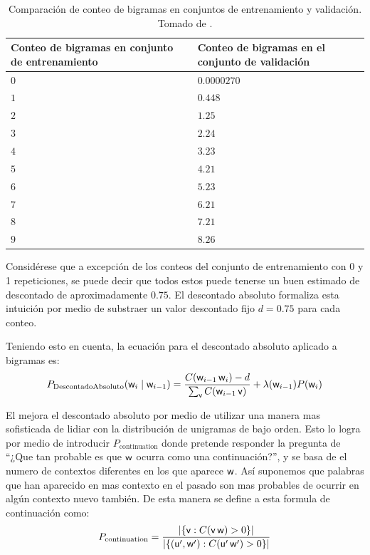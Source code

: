\begin{table}[h!]
\centering
\begin{tabular}{| R{0.2\textwidth} | L{0.2\textwidth} |} \hline
  \textbf{Conteo de bigramas en conjunto de entrenamiento}          & \textbf{Conteo de bigramas en el conjunto de validación} \\ \hline
  $0$ & $0.0000270$ \\ \hline
  $1$ & $0.448$ \\ \hline
  $2$ & $1.25$ \\ \hline
  $3$ & $2.24$ \\ \hline
  $4$ & $3.23$ \\ \hline
  $5$ & $4.21$ \\ \hline
  $6$ & $5.23$ \\ \hline
  $7$ & $6.21$ \\ \hline
  $8$ & $7.21$ \\ \hline
  $9$ & $8.26$ \\ \hline
\end{tabular}
\caption[Comparación de conteo de bigramas en conjuntos de entrenamiento y validación]{Comparación de conteo de bigramas en conjuntos de entrenamiento y validación. Tomado de \cite{jurafsky-martin}.}
\label{table:bigram-train-vs-validation-count}
\end{table}

Considérese que a excepción de los conteos del conjunto de entrenamiento con 0 y 1 repeticiones, se puede decir que todos estos puede tenerse un buen estimado de descontado de aproximadamente $0.75$. El descontado absoluto formaliza esta intuición por medio de substraer un valor descontado fijo $d=0.75$ para cada conteo.

Teniendo esto en cuenta, la ecuación para el descontado absoluto aplicado a bigramas es:
\begin{equation}
  P_{\mathrm{Descontado Absoluto}}({\mathit{\mathsf{w}}}_i \mid {\mathit{\mathsf{w}}}_{i-1}) = \frac{C({\mathit{\mathsf{w}}}_{i-1} \, {\mathit{\mathsf{w}}}_i) - d}{\sum_{{\mathit{\mathsf{v}}}} C({\mathit{\mathsf{w}}}_{i-1} \, {\mathit{\mathsf{v}}})} + \lambda({\mathit{\mathsf{w}}}_{i-1}) P({\mathit{\mathsf{w}}}_i)
\end{equation}

El  mejora el descontado absoluto por medio de utilizar una manera mas sofisticada de lidiar con la distribución de unigramas de bajo orden. Esto lo logra por medio de introducir $P_{\mathrm{continuation}}$ donde pretende responder la pregunta de ``¿Que tan probable es que ${\mathit{\mathsf{w}}}$ ocurra como una continuación?'', y se basa de el numero de contextos diferentes en los que aparece ${\mathit{\mathsf{w}}}$. Así suponemos que palabras que han aparecido en mas contexto en el pasado son mas probables de ocurrir en algún contexto nuevo también. De esta manera se define a esta formula de continuación como:
\begin{equation}
  P_{\mathrm{continuation}}  = \frac{ |\{ {\mathit{\mathsf{v}}} : C({\mathit{\mathsf{v}}} \, {\mathit{\mathsf{w}}}) > 0 \}| }{ | \{ ({\mathit{\mathsf{u}}}^{\prime}, {\mathit{\mathsf{w}}}^{\prime}) : C({\mathit{\mathsf{u}}}^{\prime} \, {\mathit{\mathsf{w}}}^{\prime}) > 0 \} | }
\end{equation}

